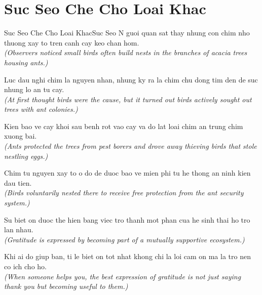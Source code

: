 \section{Suc Seo Che Cho Loai Khac}
\begin{truyen}{Suc Seo Che Cho Loai Khac}{Suc Seo}
N guoi quan sat thay nhung con chim nho thuong xay to tren canh cay keo chan hom.\\
\textit{(Observers noticed small birds often build nests in the branches of acacia trees housing ants.)}

Luc dau nghi chim la nguyen nhan, nhung ky ra la chim chu dong tim den de suc nhung lo an tu cay.\\
\textit{(At first thought birds were the cause, but it turned out birds actively sought out trees with ant colonies.)}

Kien bao ve cay khoi sau benh rot vao cay va do lat loai chim an trung chim xuong bai.\\
\textit{(Ants protected the trees from pest borers and drove away thieving birds that stole nestling eggs.)}

Chim tu nguyen xay to o do de duoc bao ve mien phi tu he thong an ninh kien dau tien.\\
\textit{(Birds voluntarily nested there to receive free protection from the ant security system.)}

Su biet on duoc the hien bang viec tro thanh mot phan cua he sinh thai ho tro lan nhau.\\
\textit{(Gratitude is expressed by becoming part of a mutually supportive ecosystem.)}

\end{truyen}
\begin{baihoc}
  Khi ai do giup ban, ti le biet on tot nhat khong chi la loi cam on ma la tro nen co ich cho ho.\\
  \textit{(When someone helps you, the best expression of gratitude is not just saying thank you but becoming useful to them.)}
\end{baihoc}

